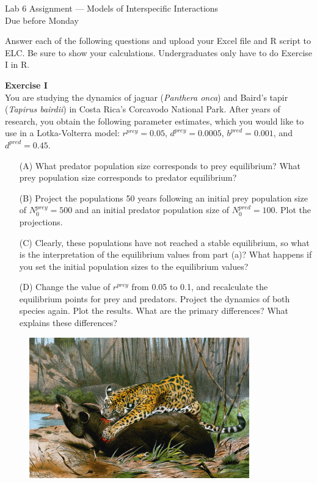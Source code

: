 \documentclass[12pt]{article}\usepackage[]{graphicx}\usepackage[]{color}
\begin{document}
{
  \Large
  \centering
  Lab 6 Assignment --- Models of Interspecific Interactions \\
  Due before Monday \par
}

Answer each of the following questions and upload your Excel file and
R script to ELC. Be sure to show your calculations. Undergraduates
only have to do Exercise I in R.  \\


\vspace{6pt}

{\bf Exercise I \\}
You are studying the dynamics of jaguar (\textit{Panthera onca}) and Baird's
tapir (\textit{Tapirus bairdii}) in Costa Rica's Corcavodo National Park. After
years of research, you obtain the following parameter estimates, which
you would like to use in a Lotka-Volterra model: $r^{prey}=0.05$,
$d^{prey}=0.0005$, $b^{pred}=0.001$, and $d^{pred}=0.45$.  
\begin{enumerate}
  \item[(A)] What predator population size corresponds to prey equilibrium?
    What prey population size corresponds to predator equilibrium? 
  \item[(B)] Project the populations 50 years following an initial prey
    population size of $N_0^{prey}=500$ and an initial predator
    population size of $N_0^{pred}=100$. Plot the projections.  
  \item[(C)] Clearly, these populations have not reached a stable
    equilibrium, so what is the interpretation of the equilibrium
    values from part (a)? What happens if you set the initial
    population sizes to the equilibrium values?  
  \item[(D)] Change the value of $r^{prey}$ from 0.05 to 0.1,
    and recalculate the equilibrium points for prey and
    predators. Project the dynamics of both species again. Plot the
    results. What are the primary differences?  What explains these
    differences? 
\end{enumerate}

\vspace{12pt}

\begin{figure}[h!]
  \centering
  \includegraphics[width=0.85\textwidth]{jaguar_killing_tapir}
  \label{fig:jag-tapir}
\end{figure}
\end{document}
